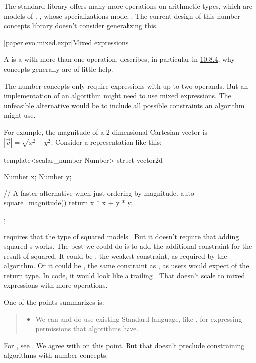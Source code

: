 \pnum
The \Cpp{} standard library offers many more operations on arithmetic types,
which are models of .
,
whose specializations model .
The current design of this number concepts library doesn't consider generalizing this.

\pnum
\wheredevelisat

[paper.evo.mixed.expr]{Mixed expressions}

\pnum
A  is a  with more than one operation.
\hrefVI{} describes,
in particular in \href{https://wg21.link/P1673R12#generalizing-associativity-helps-little}{10.8.4},
why concepts generally are of little help.

\pnum
The number concepts only require expressions with up to two operands.
But an implementation of an algorithm might need to use mixed expressions.
The unfeasible alternative would be to include all possible constraints an algorithm might use.

\pnum
For example, the magnitude of a 2-dimensional Cartesian vector is $|\vec{v}| = \sqrt{x^2 + y^2}$.
Consider a \Cpp{} representation like this:
\begin{codeblock}
template<scalar_number Number>
struct vector2d {
  Number x;
  Number y;

  // A faster alternative when just ordering by magnitude.
  auto square_magnitude() { return x * x + y * y; }
};
\end{codeblock}
 requires that the type of  squared models .
But it doesn't require that adding squared s works.
The best we could do is to add the additional constraint for the result of  squared.
It could be , the weakest constraint, as required by the algorithm.
Or it could be , the same constraint as , as users would expect of the return type.
In code, it would look like a trailing .
That doesn't scale to mixed expressions with more operations.

\pnum
One of the points \hrefVI{} summarizes is:
\begin{quote}
\begin{itemize}
\item
We can and do use existing Standard language, like ,
for expressing permissions that algorithms have.
\end{itemize}
\end{quote}
For , see .
We agree with \hrefVI{} on this point.
But that doesn't preclude constraining algorithms with number concepts.

